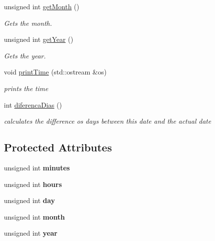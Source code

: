 \begin{DoxyCompactItemize}
unsigned int \hyperlink{classTime_a22fd86b14d3b067cf1447fd9ca5caf6f}{get\+Month} ()
\begin{DoxyCompactList}\small\item\em Gets the month. \end{DoxyCompactList}\item 
unsigned int \hyperlink{classTime_ade4d01d38041bb86a2e1ded9fd3cd28e}{get\+Year} ()
\begin{DoxyCompactList}\small\item\em Gets the year. \end{DoxyCompactList}\item 
void \hyperlink{classTime_a79d96e150ff808580fdf43932897130d}{print\+Time} (std\+::ostream \&os)
\begin{DoxyCompactList}\small\item\em prints the time \end{DoxyCompactList}\item 
int \hyperlink{classTime_a346c1dbc706dfd41e4a15b16577e4265}{diferenca\+Dias} ()
\begin{DoxyCompactList}\small\item\em calculates the difference os days between this date and the actual date \end{DoxyCompactList}\end{DoxyCompactItemize}
\subsection*{Protected Attributes}
\begin{DoxyCompactItemize}
\item 
\mbox{\label{classTime_ab9da5c3324d296464bf26131fd5d8c3f}} 
unsigned int {\bfseries minutes}
\item 
\mbox{\label{classTime_a08e7d6202b1fe8c01c25bf6688d41712}} 
unsigned int {\bfseries hours}
\item 
\mbox{\label{classTime_a9e8b7d2c0e22ab2b87a5870d0492e508}} 
unsigned int {\bfseries day}
\item 
\mbox{\label{classTime_a6076ed85da3f1d76e8c5d014ae239748}} 
unsigned int {\bfseries month}
\item 
\mbox{\label{classTime_ae2f1e52f8d00060a7cf7376927d65994}} 
unsigned int {\bfseries year}
\end{DoxyCompactItemize}


